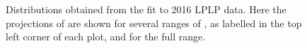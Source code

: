 \begin{figure}[h!]
\caption{Distributions obtained from the fit to 2016 LPLP data. Here the projections of \MJT are shown for several ranges of \MVV, as labelled in the top left corner of each plot, and for the full \MJO range.}
\label{fig:postfitLPLP_Y}
\end{figure}
